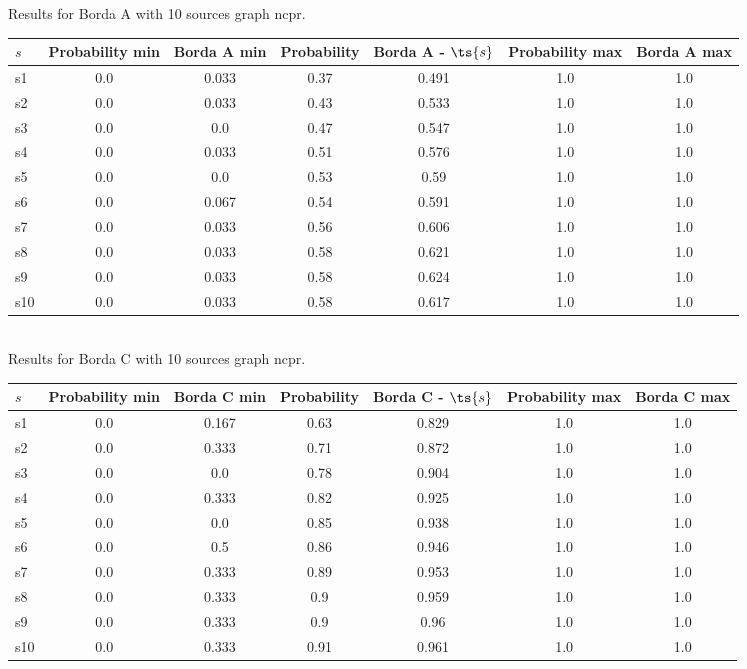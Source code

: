 \documentclass{article}
\begin{document}
\noindent Results for Borda A with 10 sources graph ncpr.

\noindent\begin{tabular}{|l|c|c|c|c|c|c|}
\hline
$s$& Probability min & Borda A min & Probability & Borda A - $\ts{s}$ & Probability max & Borda A max\\
\hline
s1 &0.0 & 0.033 & 0.37 & 0.491 & 1.0 & 1.0\\
\hline
s2 &0.0 & 0.033 & 0.43 & 0.533 & 1.0 & 1.0\\
\hline
s3 &0.0 & 0.0 & 0.47 & 0.547 & 1.0 & 1.0\\
\hline
s4 &0.0 & 0.033 & 0.51 & 0.576 & 1.0 & 1.0\\
\hline
s5 &0.0 & 0.0 & 0.53 & 0.59 & 1.0 & 1.0\\
\hline
s6 &0.0 & 0.067 & 0.54 & 0.591 & 1.0 & 1.0\\
\hline
s7 &0.0 & 0.033 & 0.56 & 0.606 & 1.0 & 1.0\\
\hline
s8 &0.0 & 0.033 & 0.58 & 0.621 & 1.0 & 1.0\\
\hline
s9 &0.0 & 0.033 & 0.58 & 0.624 & 1.0 & 1.0\\
\hline
s10 &0.0 & 0.033 & 0.58 & 0.617 & 1.0 & 1.0\\
\hline
\end{tabular}\\

\noindent Results for Borda C with 10 sources graph ncpr.

\noindent\begin{tabular}{|l|c|c|c|c|c|c|}
\hline
$s$& Probability min & Borda C min & Probability & Borda C - $\ts{s}$ & Probability max & Borda C max\\
\hline
s1 &0.0 & 0.167 & 0.63 & 0.829 & 1.0 & 1.0\\
\hline
s2 &0.0 & 0.333 & 0.71 & 0.872 & 1.0 & 1.0\\
\hline
s3 &0.0 & 0.0 & 0.78 & 0.904 & 1.0 & 1.0\\
\hline
s4 &0.0 & 0.333 & 0.82 & 0.925 & 1.0 & 1.0\\
\hline
s5 &0.0 & 0.0 & 0.85 & 0.938 & 1.0 & 1.0\\
\hline
s6 &0.0 & 0.5 & 0.86 & 0.946 & 1.0 & 1.0\\
\hline
s7 &0.0 & 0.333 & 0.89 & 0.953 & 1.0 & 1.0\\
\hline
s8 &0.0 & 0.333 & 0.9 & 0.959 & 1.0 & 1.0\\
\hline
s9 &0.0 & 0.333 & 0.9 & 0.96 & 1.0 & 1.0\\
\hline
s10 &0.0 & 0.333 & 0.91 & 0.961 & 1.0 & 1.0\\
\hline
\end{tabular}\\
\end{document}
